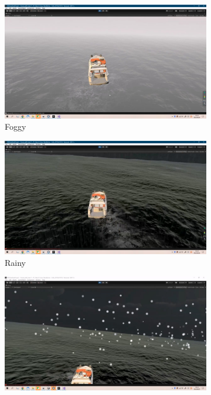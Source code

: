 \documentclass[a4paper,10pt]{article}
\begin{document}
		\begin{figure}[htbp] 
			\centering 
			
			\begin{subfigure}{0.3\textwidth}
				\includegraphics[width=\linewidth]{picture/Third-person perspective another-IP}
				\captionsetup{font=scriptsize}
				\caption{Foggy}
				\label{fig: Third-person perspective another-IP}
			\end{subfigure}
			\begin{subfigure}{0.3\textwidth}
				\includegraphics[width=\linewidth]{picture/Third-person perspective another rain-IP}
				\captionsetup{font=scriptsize}
				\caption{Rainy}
				\label{fig: Third-person perspective another rain-IP}
			\end{subfigure}
			\begin{subfigure}{0.3\textwidth}
				\includegraphics[width=\linewidth]{picture/Third-person perspective another hail-IP}

\end{subfigure}
\end{figure}
\end{document}
